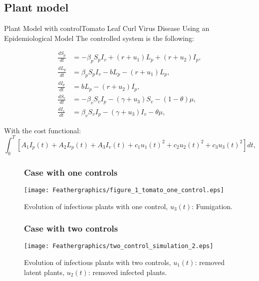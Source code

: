 \documentclass[10pt]{beamer}
\begin{document}
\subsection{Plant model}
\begin{frame}{Plant Model with control}{Tomato Leaf Curl Virus Disease Using an Epidemiological Model}
The controlled system is the following:

    \begin{equation}
        \begin{aligned}
            \frac{dS_p}{dt} &=
                -\beta_p S_p I_v +(r +u_1)L_p + (r + u_2) I_p,
            \\
            \frac{dL_p}{dt} &=
                \beta_p S_p I_v -b L_p -(r + u_1)L_p,
            \\
            \frac{dI_p}{dt} &=
                b L_p - (r + u_2) I_p,
            \\
            \frac{dS_v}{dt} &=
                -\beta_v S_v I_p - (\gamma+u_3) S_v -(1-\theta)\mu,
            \\
            \frac{dI_v}{dt} &=
                \beta_v S_v I_p -(\gamma+u_3) I_v -\theta\mu,				
        \end{aligned}
    \end{equation}
\end{frame}

\begin{frame}
	With the cost functional:
	\begin{equation}
	\int_{0}^T
	\left[
	A_1 I_p(t) + A_2 L_p(t) + A_3 I_v(t)
	+ c_1 u_1(t)^2 + c_2 u_2(t)^2 + c_3 u_3(t)^2
	\right] dt,
	\end{equation}
		
\end{frame}

\begin{frame}
\begin{figure}
\frametitle{Case with one controls}
	\centering	
	\texttt{[image: Feathergraphics/figure\_1\_tomato\_one\_control.eps]}
	\caption{Evolution of infectious plants with one control, $u_3(t)$: Fumigation.}
\end{figure}	
\end{frame}

\begin{frame}
\begin{figure}
\frametitle{Case with two controls}

	\centering	
	\texttt{[image: Feathergraphics/two\_control\_simulation\_2.eps]}
	\caption{Evolution of infectious plants with two controls, $u_1(t)$: removed latent plants, $u_2(t)$: removed infected plants.}
\end{figure}	
\end{frame}
\end{document}
